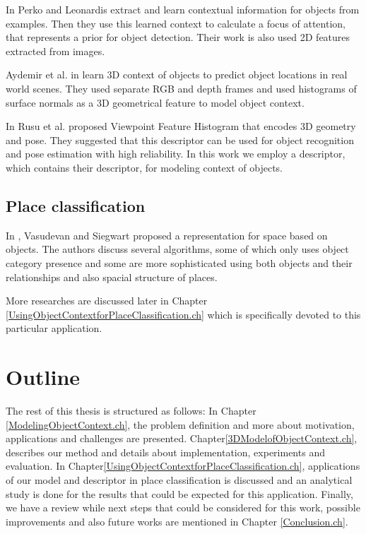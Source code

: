      In \cite{PerkoLeonardisContextDriven} Perko and Leonardis extract and learn contextual information for objects from examples.
     Then they use this learned context to calculate a focus of attention, that represents a prior for object detection. Their work is 
     also used 2D features extracted from images. 
 
      Aydemir et al. in \cite{aydemir2012_3Dcontext} learn 3D context of objects to predict object locations in 
      real world scenes. 
      They used separate RGB and depth frames and used histograms of surface normals as a 3D geometrical feature
      to model object context.
      
    In \cite{5651280} Rusu et al. proposed Viewpoint Feature Histogram that encodes 3D geometry and pose. They suggested that this descriptor
    can be used for object recognition and pose estimation with high reliability.
    In this work we employ a descriptor, which contains their descriptor, for modeling context of objects.
     
\subsection*{Place classification}

    In \cite{Vasudevan2008522}, Vasudevan and Siegwart proposed a representation for space based on objects. 
    The authors discuss several algorithms, some of which only uses object category presence and some are more sophisticated using both 
    objects and their relationships and also spacial structure of places.
    
    More researches are discussed later in Chapter \ref{UsingObjectContextforPlaceClassification.ch} which is 
    specifically devoted to this particular application.
     
\section {Outline}
\label{Outline.sec}
The rest of this thesis is structured as follows:
In Chapter \ref{ModelingObjectContext.ch}, the problem definition and more about motivation, applications and 
challenges are presented.
Chapter\ref{3DModelofObjectContext.ch}, describes our method and details about implementation, experiments and evaluation. 
In Chapter\ref{UsingObjectContextforPlaceClassification.ch}, applications of our model and descriptor in place classification is 
discussed and an analytical study is done for the results that could be expected for this application.
Finally, we have a review while next steps that could be considered for this work, possible improvements 
and also future works are mentioned in Chapter \ref{Conclusion.ch}.
